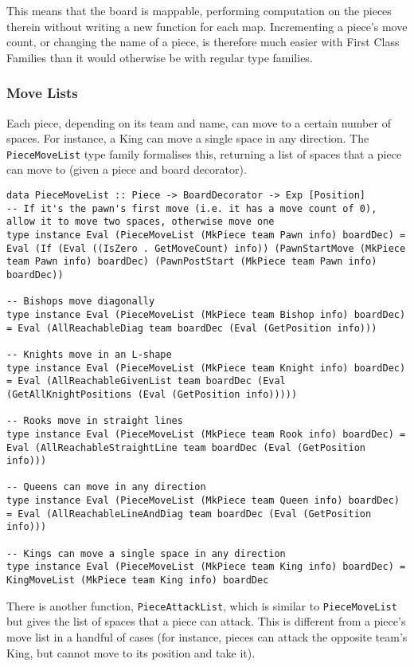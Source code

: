 \documentclass[12pt, a4paper]{scrartcl}
\begin{document}
This means that the board is mappable, performing computation on the pieces therein without writing a new function for each map. Incrementing a piece's move count, or changing the name of a piece, is therefore much easier with First Class Families than it would otherwise be with regular type families.

\subsubsection{Move Lists}

Each piece, depending on its team and name, can move to a certain number of spaces. For instance, a King can move a single space in any direction. The \lstinline{PieceMoveList} type family formalises this, returning a list of spaces that a piece can move to (given a piece and board decorator).

\begin{lstlisting}
data PieceMoveList :: Piece -> BoardDecorator -> Exp [Position]
-- If it's the pawn's first move (i.e. it has a move count of 0), allow it to move two spaces, otherwise move one
type instance Eval (PieceMoveList (MkPiece team Pawn info) boardDec) = Eval (If (Eval ((IsZero . GetMoveCount) info)) (PawnStartMove (MkPiece team Pawn info) boardDec) (PawnPostStart (MkPiece team Pawn info) boardDec))

-- Bishops move diagonally
type instance Eval (PieceMoveList (MkPiece team Bishop info) boardDec) = Eval (AllReachableDiag team boardDec (Eval (GetPosition info)))

-- Knights move in an L-shape
type instance Eval (PieceMoveList (MkPiece team Knight info) boardDec) = Eval (AllReachableGivenList team boardDec (Eval (GetAllKnightPositions (Eval (GetPosition info)))))

-- Rooks move in straight lines
type instance Eval (PieceMoveList (MkPiece team Rook info) boardDec) = Eval (AllReachableStraightLine team boardDec (Eval (GetPosition info)))

-- Queens can move in any direction
type instance Eval (PieceMoveList (MkPiece team Queen info) boardDec) = Eval (AllReachableLineAndDiag team boardDec (Eval (GetPosition info)))

-- Kings can move a single space in any direction
type instance Eval (PieceMoveList (MkPiece team King info) boardDec) = KingMoveList (MkPiece team King info) boardDec
\end{lstlisting}

There is another function, \lstinline{PieceAttackList}, which is similar to \lstinline{PieceMoveList} but gives the list of spaces that a piece can attack. This is different from a piece's move list in a handful of cases (for instance, pieces can attack the opposite team's King, but cannot move to its position and take it).
\end{document}
